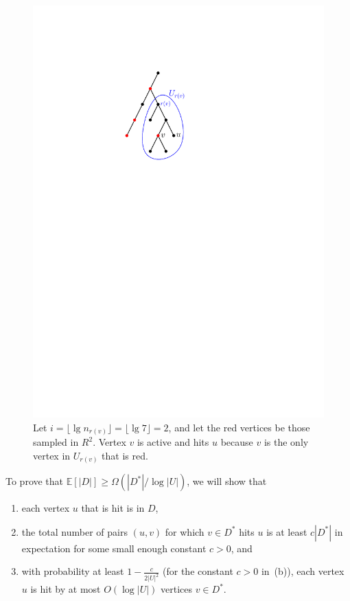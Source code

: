 \documentclass{article}
\newcommand{\f}{\frac}
\newcommand{\BE}{\begin{enumerate}}
\newcommand{\EE}{\end{enumerate}}
\newcommand{\im}{\item}
\newcommand{\Om}{\Omega}
\newcommand{\lf}{\lfloor}
\newcommand{\rf}{\rfloor}
\newcommand{\E}{\mathbb E}
\newcommand{\1}{\mathbbm 1}
\newcommand{\alert}{\textcolor{red}}
\begin{document}
\begin{figure}\centering
\includegraphics[scale=1]{hits.pdf}
\caption{Let $i=\lf\lg n_{r(v)}\rf=\lf\lg 7\rf=2$, and let the red vertices be those sampled in $R^2$. Vertex $v$ is active and hits $u$ because $v$ is the only vertex in $U_{r(v)}$ that is red.}\label{fig:hits}
\end{figure}

To prove that $\E[|D|] \ge \Om(|D^*|/\log|U|)$, we will show that
 \BE
 \im[(a)] each vertex $u$ that is hit is in $D$, 
 \im[(b)] the total number of pairs $(u,v)$ for which $v\in D^*$ hits $u$ is at least $c |D^*|$ in expectation for some small enough constant $c>0$, and
 \im[(c)] with probability at least $1-\f c{2|U|^2}$ (for the constant $c>0$ in~(b)), each vertex $u$ is hit by at most $O(\log|U|)$ vertices $v\in D^*$. %
 \EE
\end{document}
